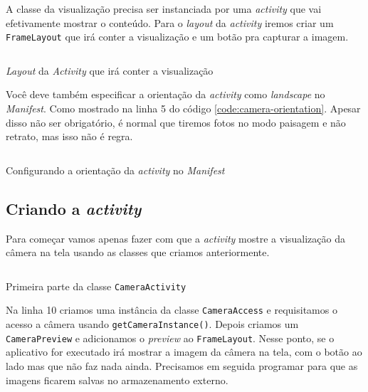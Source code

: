 \documentclass[a4paper,12pt,brazil]{book}
\begin{document}
\begin{singlespace}
	A classe da visualização precisa ser instanciada por uma \emph{activity} que vai efetivamente mostrar o conteúdo. Para o \emph{layout} da \emph{activity} iremos criar um \texttt{FrameLayout} que irá conter a visualização e um botão pra capturar a imagem.

		\begin{listing}[H]
		\inputminted[linenos=true,fontsize=\small,frame=lines, framesep=2mm, tabsize=2,numbersep=5pt]{xml}{src/api/camera/camera-layout.xml}
		\caption{\emph{Layout} da \emph{Activity} que irá conter a visualização}
		\label{code:camera-layout}
		\end{listing} 	

	Você deve também especificar a orientação da \emph{activity} como \emph{landscape} no \emph{Manifest}. Como mostrado na linha 5 do código \ref{code:camera-orientation}. Apesar disso não ser obrigatório, é normal que tiremos fotos no modo paisagem e não retrato, mas isso não é regra.

		\begin{listing}[H]
		\inputminted[linenos=true,fontsize=\small,frame=lines, framesep=2mm, tabsize=2,numbersep=5pt]{xml}{src/api/camera/camera-orientation.xml}
		\caption{Configurando a orientação da \emph{activity} no \emph{Manifest}}
		\label{code:camera-orientation}
		\end{listing} 	

	\subsection{Criando a \emph{activity}}

		Para começar vamos apenas fazer com que a \emph{activity} mostre a visualização da câmera na tela usando as classes que criamos anteriormente. 

		\begin{listing}[H]
		\inputminted[linenos=true,fontsize=\small,frame=lines, framesep=2mm, tabsize=2,numbersep=5pt]{java}{src/api/camera/camera-activity.java}
		\caption{Primeira parte da classe \texttt{CameraActivity}}
		\label{code:camera-activity}
		\end{listing} 			

		Na linha 10 criamos uma instância da classe \texttt{CameraAccess} e requisitamos o acesso a câmera usando \texttt{getCameraInstance()}. Depois criamos um \texttt{CameraPreview} e adicionamos o \emph{preview} ao \texttt{FrameLayout}. Nesse ponto, se o aplicativo for executado irá mostrar a imagem da câmera na tela, com o botão ao lado mas que não faz nada ainda. Precisamos em seguida programar para que as imagens ficarem salvas no armazenamento externo.


\end{singlespace}
\end{document}
